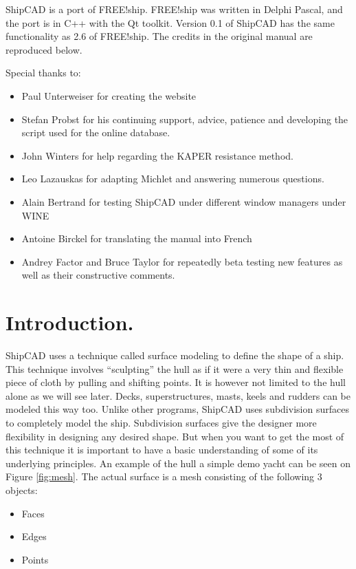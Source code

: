 \documentclass[12pt]{article}
\begin{document}
ShipCAD is a port of FREE!ship. FREE!ship was written in Delphi
Pascal, and the port is in C++ with the Qt toolkit. Version 0.1 of
ShipCAD has the same functionality as 2.6 of FREE!ship. The credits in
the original manual are reproduced below.

Special thanks to:
\begin{itemize}
  \item Paul Unterweiser for creating the website
  \item Stefan Probst for his continuing support, advice, patience and developing the script
used for the online database.
  \item John Winters for help regarding the KAPER resistance method.
  \item Leo Lazauskas for adapting Michlet and answering numerous questions.
  \item Alain Bertrand for testing ShipCAD under different window managers under WINE
  \item Antoine Birckel for translating the manual into French
  \item Andrey Factor and Bruce Taylor for repeatedly beta testing new features as well as
their constructive comments.
\end{itemize}

\pagebreak

\section {Introduction.}
ShipCAD uses a technique called surface modeling to define the shape
of a ship. This technique involves “sculpting” the hull as if it were
a very thin and flexible piece of cloth by pulling and shifting
points. It is however not limited to the hull alone as we will see
later. Decks, superstructures, masts, keels and rudders can be modeled
this way too. Unlike other programs, ShipCAD uses subdivision surfaces
to completely model the ship. Subdivision surfaces give the designer
more flexibility in designing any desired shape. But when you want to
get the most of this technique it is important to have a basic
understanding of some of its underlying principles. An example of the
hull a simple demo yacht can be seen on Figure \ref{fig:mesh}. The
actual surface is a mesh consisting of the following 3 objects:

\begin{itemize}
  \item Faces
  \item Edges
  \item Points
\end{itemize}
\end{document}

